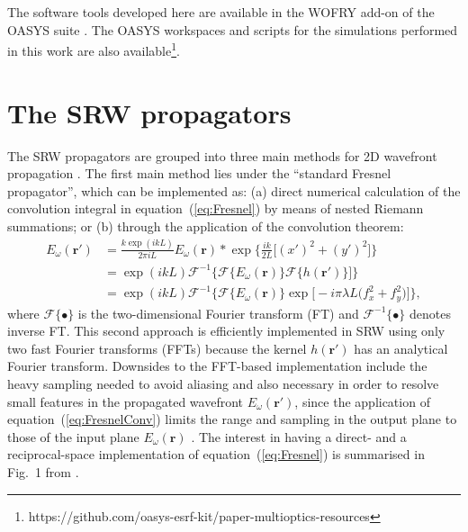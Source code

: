 \documentclass{iucr}              %
\begin{document}
The software tools developed here are available in the WOFRY add-on of the OASYS suite \cite{codeOASYS}. The OASYS workspaces and scripts for the simulations performed in this work are also available\footnote{{ https://github.com/oasys-esrf-kit/paper-multioptics-resources}}.


\appendix

\section{The SRW propagators}
\label{sec:appendixSRWpropagators}

 The SRW propagators are grouped into three main methods for 2D wavefront propagation \cite{SRWgit}. The first main method lies under the ``standard Fresnel propagator'', which can be implemented as: (a) direct numerical calculation of the convolution integral in equation~(\ref{eq:Fresnel}) by means of nested Riemann summations; or (b) through the application of the convolution theorem:
 \begin{equation}\label{eq:FresnelConv}
\begin{split}
    E_\omega(\textbf{r}')&=\frac{k\exp{(ikL)}}{2\pi i L} E_\omega(\textbf{r}) * \exp{\bigg\{ \frac{ik}{2L}\big[ (x')^2 + (y')^2 \big]\bigg\}}\\
   &= \exp{(ikL)}\mathcal{F}^{-1}\big\{\mathcal{F}\{E_\omega(\textbf{r})\}\mathcal{F}\{h(\textbf{r}')\}\big]\}\\
   &=\exp{(ikL)}\mathcal{F}^{-1}\big\{\mathcal{F}\{E_\omega(\textbf{r})\}\exp\big[-i\pi\lambda L\big(f_x^2+f_y^2\big)\big]\},
\end{split}
\end{equation}
where $\mathcal{F}\{\bullet\}$ is the two-dimensional Fourier transform (FT) and $\mathcal{F}^{-1}\{\bullet\}$ denotes inverse FT. This second approach is efficiently implemented in SRW using only two fast Fourier transforms (FFTs) because the kernel $h(\textbf{r}')$ has an analytical Fourier transform. Downsides to the FFT-based implementation include the heavy sampling needed to avoid aliasing and also necessary in order to resolve small features in the propagated wavefront $ E_\omega(\textbf{r}')$, since the application of equation~(\ref{eq:FresnelConv}) limits the range and sampling in the output plane to those of the input plane $ E_\omega(\textbf{r})$ \cite{Kelly2014}. The interest in having a direct- and a reciprocal-space implementation of equation~(\ref{eq:Fresnel}) is summarised in Fig.~1 from \cite{LiJacobsen}.
\end{document}
